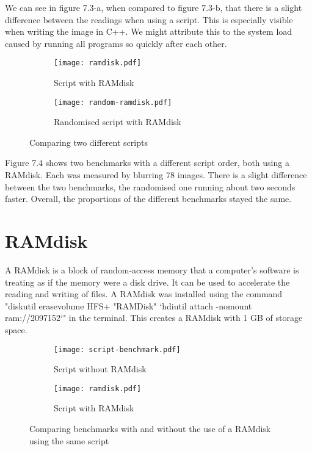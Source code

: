 We can see in figure 7.3-a, when compared to figure 7.3-b, that there is a slight difference between the readings when using a script. This is especially visible when writing the image in C++. We might attribute this to the system load caused by running all programs so quickly after each other.

\begin{figure}[H]
	\centering
	\begin{subfigure}{.5\textwidth}
	  \centering
	  \texttt{[image: ramdisk.pdf]}
	  \caption{Script with RAMdisk}
	  \label{fig:ramdisk}
	\end{subfigure}%
	\begin{subfigure}{.5\textwidth}
	  \centering
	  \texttt{[image: random-ramdisk.pdf]}
	  \caption{Randomised script with RAMdisk}
	  \label{fig:random-ramdisk}
	\end{subfigure}
	\caption{Comparing two different scripts}
	\label{fig:two-scripts}
\end{figure}

Figure 7.4 shows two benchmarks with a different script order, both using a RAMdisk. Each was measured by blurring 78 images. There is a slight difference between the two benchmarks, the randomised one running about two seconds faster. Overall, the proportions of the different benchmarks stayed the same.

\section{RAMdisk}
A RAMdisk is a block of random-access memory that a computer's software is treating as if the memory were a disk drive. It can be used to accelerate the reading and writing of files. A RAMdisk was installed using the command "diskutil erasevolume HFS+ "RAMDisk" `hdiutil attach -nomount ram://2097152`" in the terminal. This creates a RAMdisk with 1 GB of storage space.

\begin{figure}[H]
	\centering
	\begin{subfigure}{.5\textwidth}
	  \centering
	  \texttt{[image: script-benchmark.pdf]}
	  \caption{Script without RAMdisk}
	  \label{fig:script2}
	\end{subfigure}%
	\begin{subfigure}{.5\textwidth}
	  \centering
	  \texttt{[image: ramdisk.pdf]}
	  \caption{Script with RAMdisk}
	  \label{fig:ramdisk2}
	\end{subfigure}
	\caption{Comparing benchmarks with and without the use of a RAMdisk using the same script}
	\label{fig:ramdisk-vs-noramdisk}
\end{figure}

